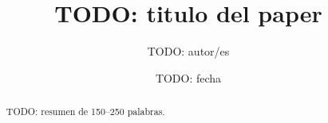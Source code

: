\documentclass[11pt]{article}
\title{TODO: titulo del paper}
\author{TODO: autor/es}
\date{TODO: fecha}
\begin{document}
\maketitle

\begin{abstract}
TODO: resumen de 150--250 palabras.
\end{abstract}








\end{document}
